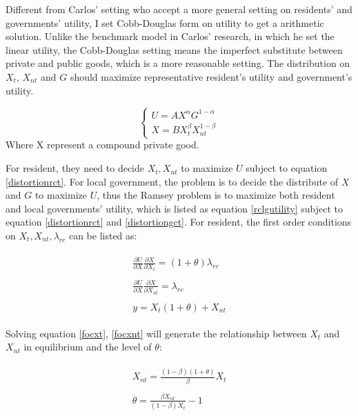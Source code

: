 Different from Carlos' setting who accept a more general setting on residents' and governments' utility, I set Cobb-Douglas form on utility to get a arithmetic solution. Unlike the benchmark model in Carlos' research, in which he set the linear utility, the Cobb-Douglas setting means the imperfect substitute between private and public goods, which is a more reasonable setting. The distribution on $X_t$, $X_{nt}$ and $G$ should maximize representative resident's utility and government's utility.

\begin{equation} \label{rclgutility}
    \left\{\begin{array}{l}U=A X^\alpha G^{1-\alpha} \\ X=B X_t^\beta X_{n t}^{1-\beta}\end{array}\right.
\end{equation}
Where X represent a compound private good.

For resident, they need to decide $X_t, X_{nt}$ to maximize $U$ subject to equation \ref{distortionrct}. For local government, the problem is to decide the distribute of $X$ and $G$ to maximize $U$, thus the Ramsey problem is to maximize both resident and local governments' utility, which is listed as equation \ref*{rclgutility} subject to equation \ref{distortionrct} and \ref{distortiongct}. For resident, the first order conditions on $X_t, X_{nt}, \lambda_{rc}$ can be listed as:

\begin{align}
    \begin{split}
        \frac{\partial U}{\partial X} \frac{\partial X}{\partial X_t}=(1+\theta) \lambda_{r c} \label{focxt}
    \end{split}                     \\
    \begin{split}
        \frac{\partial U}{\partial X} \frac{\partial X}{\partial X_{nt}}=\lambda_{r c} \label{focxnt}
    \end{split} \\
    \begin{split}
        y=X_t(1+\theta)+X_{nt} \label{foclabrc}
    \end{split}
\end{align}

Solving equation \ref{focxt}, \ref{focxnt} will generate the relationship between $X_t$ and $X_{nt}$ in equilibrium and the level of $\theta$:

\begin{align}
    \begin{split}
        X_{nt}=\frac{(1-\beta)(1+\theta)}{\beta}X_t \label{xtxnt}
    \end{split} \\
    \begin{split}
        \theta=\frac{\beta X_{n t}}{(1-\beta) X_t}-1 \label{theta}
    \end{split}
\end{align}

